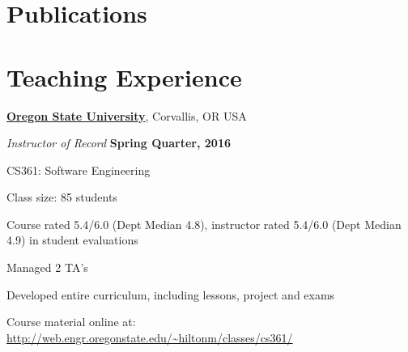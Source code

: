 \documentclass[10pt]{article}
\begin{document}
\vspace{-5pt}

%
%
%



\section{Publications}

\begin{publications}

\end{publications}
\vspace{-10pt}

\section{Teaching Experience}

\href{http://www.oregonstate.edu/}{\textbf{Oregon State University}},
Corvallis, OR USA
\begin{outerlist}
\item[] \textit{Instructor of Record}%
    \hfill \textbf{Spring Quarter, 2016}
    \begin{innerlist}%
       \item CS361: Software Engineering %
       \item Class size: 85 students 
       \item Course rated 5.4/6.0 (Dept Median 4.8), instructor rated 5.4/6.0 (Dept Median 4.9) in student evaluations
       \item Managed 2 TA's
       \item Developed entire curriculum, including lessons, project and exams
       \item Course material online at:\\ \url{http://web.engr.oregonstate.edu/~hiltonm/classes/cs361/}  
     \end{innerlist}
\end{outerlist}
\vspace{10pt}
\end{document}
